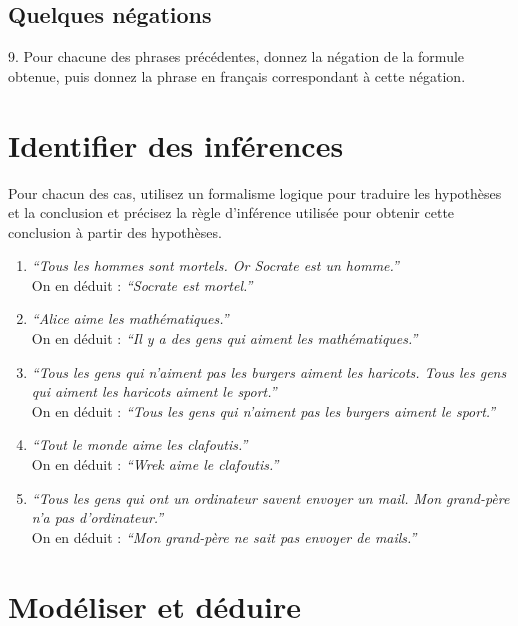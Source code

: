 \documentclass[a4paper,11pt]{article}
\begin{document}
\subsection{Quelques négations}

9. Pour chacune des phrases précédentes, donnez la négation de la formule obtenue, puis donnez la phrase en français correspondant à cette négation.

\section{Identifier des inférences}

Pour chacun des cas, utilisez un formalisme logique pour traduire les hypothèses et la conclusion et précisez la règle d'inférence utilisée pour obtenir cette conclusion à partir des hypothèses.

\begin{enumerate}
\item \emph{``Tous les hommes sont mortels. Or Socrate est un homme.''}\\
On en déduit : \emph{``Socrate est mortel.''}

\item \emph{``Alice aime les mathématiques.''}\\
On en déduit : \emph{``Il y a des gens qui aiment les mathématiques.''}

\item \emph{``Tous les gens qui n'aiment pas les burgers aiment les haricots. Tous les gens qui aiment les haricots aiment le sport.''}\\
On en déduit : \emph{``Tous les gens qui n'aiment pas les burgers aiment le sport.''}

\item \emph{``Tout le monde aime les clafoutis.''}\\
On en déduit : \emph{``Wrek aime le clafoutis.''}

\item \emph{``Tous les gens qui ont un ordinateur savent envoyer un mail. Mon grand-père n'a pas d'ordinateur.''}\\
On en déduit : \emph{``Mon grand-père ne sait pas envoyer de mails.''}
\end{enumerate}

\section{Modéliser et déduire}
\end{document}
